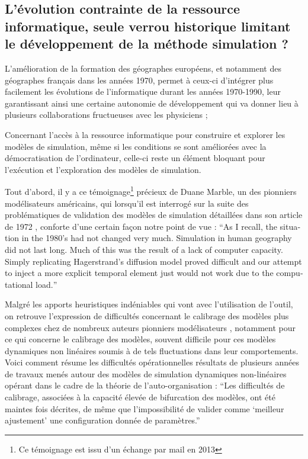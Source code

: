 \subsection{L'évolution contrainte de la ressource informatique, seule verrou historique limitant le développement de la méthode simulation ?}
\label{sec:verrou_informatique}

L'amélioration de la formation des géographes européens, et notamment des géographes français dans les années 1970, permet à ceux-ci d'intégrer plus facilement les évolutions de l'informatique durant les années 1970-1990, leur garantissant ainsi une certaine autonomie de développement qui va donner lieu à plusieurs collaborations fructueuses avec les physiciens \autocite{Pumain1984}; 

Concernant l'accès à la ressource informatique pour construire et explorer les modèles de simulation, même si les conditions se sont améliorées avec la démocratisation de l'ordinateur, celle-ci reste un élément bloquant pour l'exécution et l'exploration des modèles de simulation.

Tout d'abord, il y a ce témoignage\footnote{Ce témoignage est issu d'un échange par mail en 2013} précieux de Duane Marble, un des pionniers modélisateurs américains, qui lorsqu'il est interrogé sur la suite des problématiques de validation des modèles de simulation détaillées dans son article de 1972 \autocite{Marble1972}, conforte d'une certain façon notre point de vue : \foreignquote{english}{As I recall, the situation in the 1980's had not changed very much. Simulation in human geography did not last long. Much of this was the result of a lack of computer capacity. Simply replicating Hagerstrand's diffusion model proved difficult and our attempt to inject a more explicit temporal element just would not work due to the computational load.}

Malgré les apports heuristiques indéniables qui vont avec l'utilisation de l'outil, on retrouve l'expression de difficultés concernant le calibrage des modèles plus complexes chez de nombreux auteurs pionniers modélisateurs \autocites{Batty1976, Pumain1998a}[400]{Sanders1984}, notamment pour ce qui concerne le calibrage des modèles, souvent difficile pour ces modèles dynamiques non linéaires soumis à de tels fluctuations dans leur comportements. Voici comment \autocite{Pumain1998a} résume les difficultés opérationnelles résultats de plusieurs années de travaux menés autour des modèles de simulation dynamiques non-linéaires opérant dans le cadre de la théorie de l'auto-organisation : \enquote{Les difficultés de calibrage, associées à la capacité élevée de bifurcation des modèles, ont été maintes fois décrites, de même que l’impossibilité de valider comme \enquote{meilleur ajustement} une configuration donnée de paramètres.}

